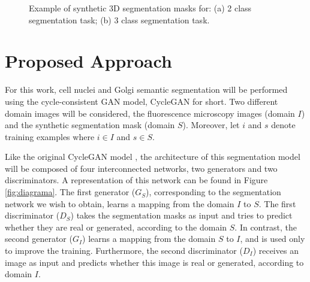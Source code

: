 \begin{figure}[!htb]
	\centering
	\hfil
	\caption{Example of synthetic \ac{3D} segmentation masks for: (a) 2 class segmentation task; (b) 3 class segmentation task.}
	\label{fig:sintetica}
\end{figure}


\section{Proposed Approach}
\label{section:proposed}

For this work, cell nuclei and Golgi semantic segmentation will be performed using the cycle-consistent \ac{GAN} model, CycleGAN for short. Two different domain images will be considered, the fluorescence microscopy images (domain $I$) and the synthetic segmentation mask (domain $S$). Moreover, let $i$ and $s$ denote training examples where $i \in I$ and $s \in S$.

Like the original CycleGAN model \cite{cycleGAN:original}, the architecture of this segmentation model will be composed of four interconnected networks, two generators and two discriminators. A representation of this network can be found in Figure \ref{fig:diagrama}. The first generator ($G_S$), corresponding to the segmentation network we wish to obtain, learns a mapping from the domain $I$ to $S$. The first discriminator ($D_S$) takes the segmentation masks as input and tries to predict whether they are real or generated, according to the domain $S$. In contrast, the second generator ($G_I$) learns a mapping from the domain $S$ to $I$, and is used only to improve the training. Furthermore, the second discriminator ($D_I$) receives an image as input and predicts whether this image is real or generated, according to domain $I$.

